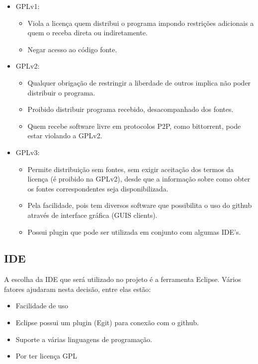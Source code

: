 \documentclass[12pt,a4paper]{article}
\begin{document}
\begin{itemize}
\item GPLv1:
\begin{itemize}
\item Viola a licença quem distribui o programa impondo restrições adicionais a quem o receba direta ou indiretamente.
\item Negar acesso ao código fonte.
\end{itemize}

\item GPLv2:
\begin{itemize}
\item Qualquer obrigação de restringir a liberdade de outros implica não poder distribuir o programa.
\item Proibido distribuir programa recebido, desacompanhado dos fontes.
\item Quem recebe software livre em protocolos P2P, como bittorrent, pode estar violando a GPLv2.
\end{itemize}

\item GPLv3:
\begin{itemize}
\item Permite distribuição sem fontes, sem exigir aceitação dos termos da licença (é proibido na GPLv2), desde que a informação sobre como obter os fontes correspondentes seja disponibilizada.
\item Pela facilidade, pois tem diversos software que possibilita o uso do github através de interface gráfica (GUIS clients).
\item Possui plugin que pode ser utilizada em conjunto com algumas IDE's.
\end{itemize}
\end{itemize}

\subsection{IDE}

A escolha da IDE que será utilizado no projeto é a ferramenta Eclipse. Vários fatores ajudaram nesta decisão, entre elas estão:
\begin{itemize}
\item Facilidade de uso
\item Eclipse possui um plugin (Egit) para conexão com o github.
\item Suporte a várias linguagens de programação.
\item Por ter licença GPL
\end{itemize}
\end{document}
